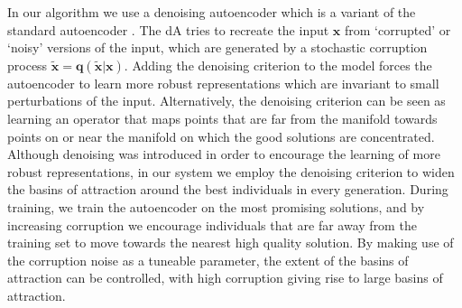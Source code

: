 \documentclass[twoside]{article}
\begin{document}






In our algorithm we use a denoising autoencoder which is a variant of the standard autoencoder \cite{vincent2008extracting}. The dA tries to recreate the input $\mathbf x$ from `corrupted' or `noisy' versions of the input, which are generated by a stochastic corruption process $\mathbf{\tilde x = q(\tilde x|x)}$. Adding the denoising criterion to the model forces the autoencoder to learn more robust representations which are invariant to small perturbations of the input. Alternatively, the denoising criterion can be seen as learning an operator that maps points that are far from the manifold towards points on or near the manifold on which the good solutions are concentrated. Although denoising was introduced in order to encourage the learning of more robust representations, in our system we employ the denoising criterion to widen the basins of attraction around the best individuals in every generation. During training, we train the autoencoder on the most promising solutions, and by increasing corruption we encourage individuals that are far away from the training set to move towards the nearest high quality solution. By making use of the corruption noise as a tuneable parameter, the extent of the basins of attraction can be controlled, with high corruption giving rise to large basins of attraction.
\end{document}
